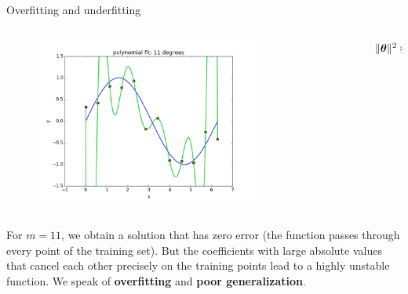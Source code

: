 \documentclass[xcolor=pdftex,dvipsnames,table,mathserif]{beamer}
\begin{document}
\begin{frame}{Overfitting and underfitting}
\begin{columns}
\begin{column}{.8\textwidth}
\begin{figure}[htb]
	\includegraphics[width=0.75\textwidth]{../graphics/polyfit_degree_11.png}
\end{figure}
\end{column}
\begin{column}{.2\textwidth}
$\| \boldsymbol{\theta} \|^2 \approx 10^7$
\end{column}
\end{columns}
For $m=11$, we obtain a solution that has zero error (the function passes through every point of the training set). But the coefficients with large absolute values that cancel each other precisely on the training points lead to a highly unstable function. We speak of \textbf{overfitting} and \textbf{poor generalization}.
\end{frame}
\end{document}
